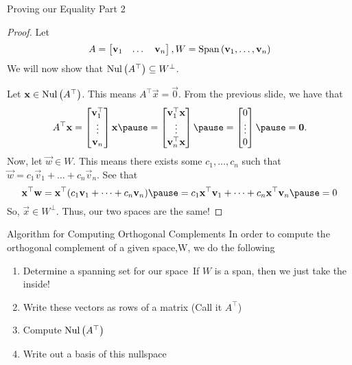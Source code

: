 \documentclass[xcoler=dvipsnames, aspectratio=169]{beamer}
\begin{document}
    \begin{frame}{Proving our Equality Part 2}
        \small
        \begin{proof}
        Let 
            \[
                A = \begin{bmatrix}
                    \mathbf{v}_1 & \dots & \mathbf{v}_n
                \end{bmatrix}, W = \text{Span}\left(\mathbf{v}_1,\dots,\mathbf{v}_n\right)
            \]\pause
            We will now show that $\mathrm{Nul}\left(A^\top\right)\subseteq W^\perp$.\pause

            Let $\mathbf{x}\in\mathrm{Nul}\left(A^\top\right)$. This means $A^\top\vec{x}=\vec{0}$. From the previous
            slide, we have that\pause
                \[
                    A^\top\vec{x} = \bMat{
                        \vec{v}_1^\top \\
                        \vdots \\
                        \vec{v}_n
                    }\vec{x}\pause = \bMat{
                        \vec{v}_1^\top\vec{x} \\
                        \vdots \\
                        \vec{v}_n^\top\vec{x}
                    }\pause = \bMat{0\\\vdots\\0}\pause = \vec{0}.
                \]\pause
            Now, let $\vec{w}\in W$. This means there exists some $c_1, \dots, c_n$ such that
            $\vec{w} = c_1\vec{v}_1 + \dots + c_n\vec{v}_n$. See that\pause
            \[
                \vec{x}^\top\vec{w} = \vec{x}^\top(c_1\vec{v}_1 + \dots + c_n\vec{v}_n)
                \pause= c_1\vec{x}^\top\vec{v}_1 + \dots + c_n \vec{x}^\top\vec{v}_n\pause = 0
            \]
            So, $\vec{x}\in W^\perp$. Thus, our two spaces are the same!
        \end{proof}
    \end{frame}
    \begin{frame}{Algorithm for Computing Orthogonal Complements}
        In order to compute the orthogonal complement of a given space,W, we do the following
        \begin{enumerate}
            \pause\item Determine a spanning set for our space\pause\ If $W$ is a span, then we just
                take the inside!
            \pause\item Write these vectors as rows of a matrix (Call it $A^\top$)
            \pause\item Compute $\mathrm{Nul}\left(A^\top\right)$
            \pause\item Write out a basis of this nullspace
        \end{enumerate}
    \end{frame}
\end{document}
